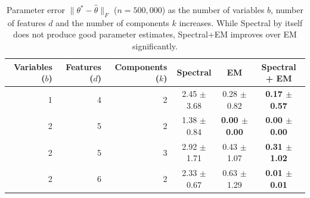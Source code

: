 \begin{table}[tbhp]
\caption{Parameter error $\|\theta^* - \hat \theta\|_F$ ($n = 500,000$)
as the number of variables $b$, number of features $d$ and the number of components $k$ increases.
While Spectral by itself does not produce good parameter estimates, Spectral+EM improves
over EM significantly.
}
\label{tbl:parameter-recovery}
\vskip 0.15in
\begin{center}
\begin{small}
\begin{sc}

  \begin{tabular}{ r r r c c c }
\hline
\abovespace\belowspace
Variables ($b$) & Features ($d$) & Components ($k$) & Spectral & EM & Spectral + EM \\
\hline
\abovespace
  1 & 4 & 2 & 2.45 $\pm$ 3.68 & 0.28 $\pm$ 0.82 & {\bf 0.17 $\pm$ 0.57} \\
2 & 5 & 2 & 1.38 $\pm$ 0.84 & {\bf 0.00 $\pm$ 0.00} & {\bf 0.00 $\pm$ 0.00} \\
  2 & 5 & 3 & 2.92 $\pm$ 1.71 & 0.43 $\pm$ 1.07 & {\bf 0.31 $\pm$ 1.02} \\
  2 & 6 & 2 & 2.33 $\pm$ 0.67 & 0.63 $\pm$ 1.29 & {\bf 0.01 $\pm$ 0.01} \\



\end{tabular}
\end{sc}
\end{small}
\end{center}
\end{table}
